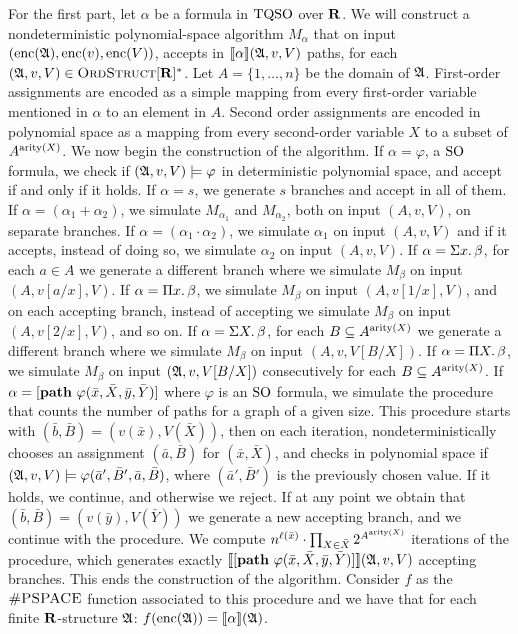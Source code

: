 \vspace{1em}
For the first part, let $\alpha$ be a formula in ${\rm TQSO}$ over $\mathbf{R}$. 
We will construct a nondeterministic polynomial-space algorithm $M_{\alpha}$ that on input $({\rm enc}(\mathfrak{A}),{\rm enc}(v),{\rm enc}(V))$, accepts in ${\llbracket{}{\alpha}\rrbracket}(\mathfrak{A},v,V)$ paths, for each $(\mathfrak{A},v,V)\in\text{\sc OrdStruct}[\mathbf{R}]^*$. Let $A = \{1,\ldots,n\}$  be the domain of $\mathfrak{A}$. 
First-order assignments are encoded as a simple mapping from every first-order variable mentioned in $\alpha$ to an element in $A$. 
Second order assignments are encoded in polynomial space as a mapping from every second-order variable $X$ to a subset of $A^{{\rm arity}(X)}$. We now begin the construction of the algorithm. 
If $\alpha = \varphi$, a ${\rm SO}$ formula, we check if $(\mathfrak{A},v,V)\models\varphi$ in deterministic polynomial space, and accept if and only if it holds. 
If $\alpha = s$, we generate $s$ branches and accept in all of them. 
If $\alpha = (\alpha_1 + \alpha_2)$, we simulate $M_{\alpha_1}$ and $M_{\alpha_2}$, both on input $(A,v,V)$, on separate branches. 
If $\alpha = (\alpha_1\cdot\alpha_2)$, we simulate $\alpha_1$ on input $(A,v,V)$ and if it accepts, instead of doing so, we simulate $\alpha_2$ on input $(A,v,V)$. 
If $\alpha = \Sigma{x}.\,\beta$, for each $a\in A$ we generate a different branch where we simulate $M_{\beta}$ on input $(A,v[a/x],V)$.
If $\alpha = \Pi{x}.\,\beta$, we simulate $M_{\beta}$ on input $(A,v[1/x],V)$, and on each accepting branch, instead of accepting we simulate $M_{\beta}$ on input $(A,v[2/x],V)$, and so on. 
If $\alpha = \Sigma{X}.\,\beta$, for each $B\subseteq A^{{\rm arity}(X)}$ we generate a different branch where we simulate $M_{\beta}$ on input $(A,v,V[B/X])$.
If $\alpha = \Pi{X}.\,\beta$, we simulate $M_{\beta}$ on input $(\mathfrak{A},v,V[B/X])$ consecutively for each $B\subseteq A^{{\rm arity}(X)}$. 
If $\alpha = [{\bf path} \,\, \varphi(\bar{x},\bar{X},\bar{y},\bar{Y})]$ where $\varphi$ is an ${\rm SO}$ formula, we simulate the procedure that counts the number of paths for a graph of a given size. This procedure starts with $(\bar{b},\bar{B}) = (v(\bar{x}),V(\bar{X}))$, then on each iteration, nondeterministically chooses an assignment $(\bar{a},\bar{B})$ for $(\bar{x},\bar{X})$, and checks in polynomial space if $(\mathfrak{A},v,V)\models\varphi(\bar{a}',\bar{B}',\bar{a},\bar{B})$, where $(\bar{a}',\bar{B}')$ is the previously chosen value. If it holds, we continue, and otherwise we reject. If at any point we obtain that $(\bar{b}, \bar{B}) = (v(\bar{y}),V(\bar{Y}))$ we generate a new accepting branch, and we continue with the procedure.
We compute $n^{\ell(\bar{x})}\cdot \prod_{X\in\bar{X}} 2^{A^{{\rm arity}(X)}}$ iterations of the procedure, which generates exactly ${\llbracket{}{[{\bf path} \,\, \varphi(\bar{x},\bar{X},\bar{y},\bar{Y})]}\rrbracket}(\mathfrak{A},v,V)$ accepting branches. 
This ends the construction of the algorithm. 
Consider $f$ as the $\text{\sc \#PSPACE}$ function associated to this procedure and we have that for each finite $\mathbf{R}$-structure $\mathfrak{A}$: $f({\rm enc}(\mathfrak{A})) = {\llbracket{}{\alpha}\rrbracket}(\mathfrak{A})$.

